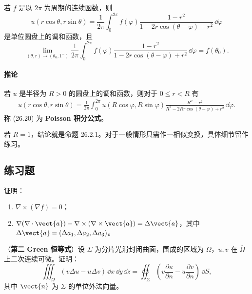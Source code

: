 \begin{xproposition}[26.2.1]
若 $f$ 是以 $2\pi$ 为周期的连续函数，则
\[
  u(r\cos\theta,r\sin\theta)
  =\frac{1}{2\pi}\int_0^{2\pi}f(\varphi)
  \frac{1-r^2}{1-2r\cos(\theta-\varphi)+r^2}\,\dd\varphi
\]
是单位圆盘上的调和函数，且
\[
  \lim_{(\theta,r)\to(\theta_0,1^-)}\frac{1}{2\pi}\int_0^{2\pi}f(\varphi)
  \frac{1-r^2}{1-2r\cos(\theta-\varphi)+r^2}\,\dd\varphi=f(\theta_0).
\]
\end{xproposition}

\paragraph{推论}
若 $u$ 是半径为 $R>0$ 的圆盘上的调和函数，则对于 $0\le r<R$ 有
\begin{equation}
  \begin{aligned}
  u(r\cos\theta,r\sin\theta)
  =\frac{1}{2\pi}\int_0^{2\pi}u(R\cos\varphi,R\sin\varphi)
  \frac{R^2-r^2}{R^2-2Rr\cos(\theta-\varphi)+r^2}\,\dd\varphi.
  \end{aligned}
  \tag{26.20}
  \label{eq:26.20}
\end{equation}
称 (26.20) 为 \textbf{Poisson 积分公式}。

\begin{xproof}
若 $R=1$，结论就是命题 26.2.1。对于一般情形只需作一相似变换，具体细节留作练习。
\end{xproof}

\subsection{练习题}

\begin{xexercise}[1]
证明：
\begin{enumerate}[label=(\arabic*)]
  \item $\nabla\times(\nabla f)=0$；
  \item $\nabla(\nabla\cdot\vect{a})-\nabla\times(\nabla\times\vect{a})=\Delta\vect{a}$，其中 $\Delta\vect{a}=(\Delta a_1,\Delta a_2,\Delta a_3)$。
\end{enumerate}
\end{xexercise}

\begin{xexercise}[2]
（\textbf{第二 Green 恒等式}）设 $\Sigma$ 为分片光滑封闭曲面，围成的区域为 $\Omega$，$u,v$ 在 $\overline\Omega$ 上二次连续可微。证明：
\[
  \iiint_\Omega(v\Delta u-u\Delta v)\,\dd x\,\dd y\,\dd z
  =\oiint_\Sigma\left(v\frac{\partial u}{\partial n}-u\frac{\partial v}{\partial n}\right)\,\dd S,
\]
其中 $\vect{n}$ 为 $\Sigma$ 的单位外法向量。
\end{xexercise}

